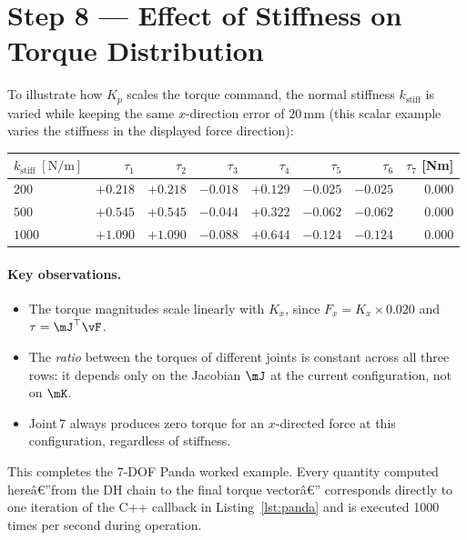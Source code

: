 \section{Step 8 --- Effect of Stiffness on Torque Distribution}
\label{app:panda_stiffness}

To illustrate how $K_p$ scales the torque command, the
normal stiffness $k_{\mathrm{stiff}}$ is varied while keeping the
same $x$-direction error of $20\,\mathrm{mm}$
(this scalar example varies the stiffness in the displayed force direction):

\begin{center}
\renewcommand{\arraystretch}{1.35}
\begin{tabular}{@{}lrrrrrrr@{}}
\toprule
$k_{\mathrm{stiff}}\;[\mathrm{N/m}]$
  & $\tau_1$ & $\tau_2$ & $\tau_3$ & $\tau_4$
  & $\tau_5$ & $\tau_6$ & $\tau_7$ [Nm] \\
\midrule
$200$
  & $+0.218$ & $+0.218$ & $-0.018$ & $+0.129$
  & $-0.025$ & $-0.025$ & $0.000$ \\
$500$
  & $+0.545$ & $+0.545$ & $-0.044$ & $+0.322$
  & $-0.062$ & $-0.062$ & $0.000$ \\
$1000$
  & $+1.090$ & $+1.090$ & $-0.088$ & $+0.644$
  & $-0.124$ & $-0.124$ & $0.000$ \\
\bottomrule
\end{tabular}
\end{center}

\paragraph{Key observations.}
\begin{itemize}
  \item The torque magnitudes scale linearly with $K_x$, since
        $F_x = K_x \times 0.020$ and $\tau = \mJ^\top\vF$.
  \item The \emph{ratio} between the torques of different joints is
        constant across all three rows: it depends only on the Jacobian
        $\mJ$ at the current configuration, not on $\mK$.
  \item Joint\,7 always produces zero torque for an $x$-directed force
        at this configuration, regardless of stiffness.
\end{itemize}

\bigskip
\noindent
This completes the 7-DOF Panda worked example.
Every quantity computed hereâ€”from the DH chain to the final torque vectorâ€”
corresponds directly to one iteration of the C++ callback in
Listing~\ref{lst:panda} and is executed 1000 times per second during
operation.


